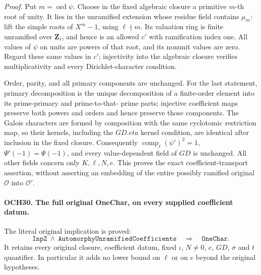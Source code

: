 \emph{Proof.}
Put \(m=\operatorname{ord}\psi\).  Choose in the fixed
algebraic closure a primitive \(m\)-th root of unity.  It lies
in the unramified extension whose residue field contains
\(\mu_m\): lift the simple roots of \(X^m-1\), using
\(\ell\nmid m\).  Its valuation ring is finite unramified
over \(\mathbf Z_\ell\), and hence is an allowed \(c'\)
with ramification index one.  All values of \(\psi\) on units
are powers of that root, and its nonunit values are zero.
Regard these same values in \(c'\); injectivity into the
algebraic closure verifies multiplicativity and every
Dirichlet-character condition.

Order, parity, and all primary components are unchanged.  For the
last statement, primary decomposition is the unique decomposition
of a finite-order element into its prime-primary and prime-to-that-
prime parts; injective coefficient maps preserve both powers and
orders and hence preserve those components.  The Galois characters
are formed by composition with the same cyclotomic restriction
map, so their kernels, including the \(GD.eta\) kernel
condition, are identical after inclusion in the fixed closure.
Consequently \(\operatorname{comp}_\ell(\psi')^2=1\),
\(\Psi'(-1)=\Psi(-1)\), and every value-dependent field of
\(GD\) is unchanged.  All other fields concern only
\(K,\ell,N,e\).  This proves the exact coefficient-transport
assertion, without asserting an embedding of the entire possibly
ramified original \(\mathcal O\) into \(\mathcal O'\).

\paragraph{OCH30. The full original OneChar, on every supplied coefficient datum.}
\label{claim:OCH30}
The literal original implication is proved:
\[
       \texttt{InpZ}\ \wedge\
       \texttt{AutomorphyUnramifiedCoefficients}
                    \quad\Longrightarrow\quad\texttt{OneChar}.
 \tag{OCH.20}
\]
It retains every original closure, coefficient datum, fixed
\(\iota\), \(N\ne0\), \(e\), \(GD\),
\(\sigma\) and \(t\) quantifier.  In particular it adds
no lower bound on \(\ell\) or on \(e\) beyond the original
hypotheses.

